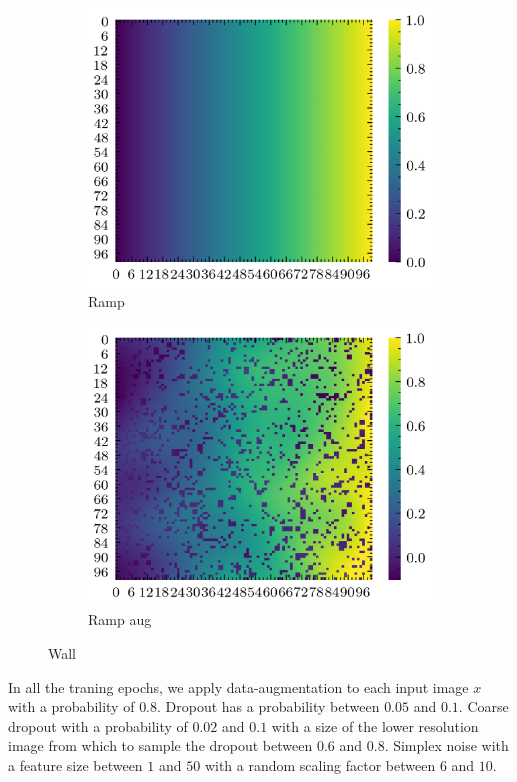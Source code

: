 \documentclass[../document.tex]{subfiles}
\begin{document}
\begin{figure}[H]
\begin{subfigure}[b]{0.23\textwidth}
            \includegraphics[width=\textwidth]{../img/data-aug/2d/ramp.png}
            \caption{Ramp}
        \end{subfigure}
        \begin{subfigure}[b]{0.23\linewidth}
            \includegraphics[width=\textwidth]{../img/data-aug/2d/ramp-aug.png}
            \caption{Ramp aug}
        \end{subfigure}    
    \label{fig: others-aug}
    \caption{Wall}    
\end{figure}
In all the traning epochs, we apply data-augmentation to each input image $x$ with a probability of $0.8$. Dropout has a probability between $0.05$ and $0.1$. Coarse dropout with a probability of $0.02$ and $0.1$ with a size of the lower resolution image from which to sample the dropout between $0.6$ and $0.8$. Simplex noise with a feature size between $1$ and $50$ with a random scaling factor between $6$ and $10$. 
\end{document}
